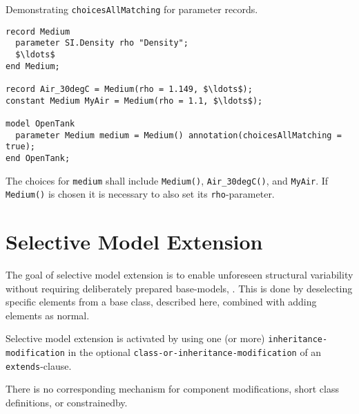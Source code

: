 \begin{example}
Demonstrating \lstinline!choicesAllMatching! for parameter records.
\begin{lstlisting}[language=modelica]
record Medium
  parameter SI.Density rho "Density";
  $\ldots$
end Medium;

record Air_30degC = Medium(rho = 1.149, $\ldots$);
constant Medium MyAir = Medium(rho = 1.1, $\ldots$);

model OpenTank
  parameter Medium medium = Medium() annotation(choicesAllMatching = true);
end OpenTank;
\end{lstlisting}
The choices for \lstinline!medium! shall include \lstinline!Medium()!, \lstinline!Air_30degC()!, and \lstinline!MyAir!.
If \lstinline!Medium()! is chosen it is necessary to also set its \lstinline!rho!-parameter.
\end{example}


\section{Selective Model Extension}\label{selective-model-extension}

\begin{nonnormative}
The goal of selective model extension is to enable unforeseen structural variability without requiring deliberately prepared base-models, \textcite{Buerger2019SelectiveModel}.
This is done by deselecting specific elements from a base class, described here, combined with adding elements as normal.
\end{nonnormative}

Selective model extension is activated by using one (or more) \lstinline[language=grammar]!inheritance-modification! in the optional \lstinline[language=grammar]!class-or-inheritance-modification! of an \lstinline!extends!-clause.

\begin{nonnormative}
There is no corresponding mechanism for component modifications, short class definitions, or constrainedby.
\end{nonnormative}

